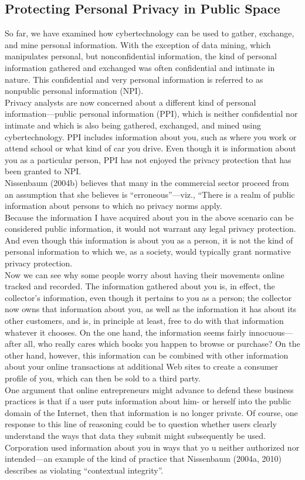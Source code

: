 \documentclass[12pt]{article}
\theoremstyle{definition}
\begin{document}
\subsection{Protecting Personal Privacy in Public Space}
So far, we have examined how cybertechnology can be used to gather, exchange, and
mine personal information. With the exception of data mining, which manipulates
personal, but nonconfidential information, the kind of personal information gathered
and exchanged was often confidential and intimate in nature. This confidential and very personal information is
referred to as nonpublic personal information (NPI).\\
Privacy analysts are now concerned
about a different kind of personal information—public personal information (PPI), which
is neither confidential nor intimate and which is also being gathered, exchanged, and
mined using cybertechnology.
PPI includes information about you, such as where you work or attend school or what
kind of car you drive. Even though it is information about you as a particular person, PPI
has not enjoyed the privacy protection that has been granted to NPI.\\
Nissenbaum (2004b) believes
that many in the commercial sector proceed from an assumption that she believes is
“erroneous”—viz., “There is a realm of public information about persons to which no
privacy norms apply.\\
Because the information I have acquired about you in the above scenario can be
considered public information, it would not warrant any legal privacy protection. And
even though this information is about you as a person, it is not the kind of personal
information to which we, as a society, would typically grant normative privacy protection.\\
Now we can see why some people worry about having their movements online
tracked and recorded. The information gathered about you is, in effect, the collector's
information, even though it pertains to you as a person; the collector now owns that information
about you, as well as the information it has about its other customers, and is, in principle
at least, free to do with that information whatever it chooses. On the one hand, the
information seems fairly innocuous—after all, who really cares which books you happen
to browse or purchase? On the other hand, however, this information can be combined
with other information about your online transactions at additional Web sites to create a
consumer profile of you, which can then be sold to a third party.\\
One argument that online entrepreneurs might advance to defend these business
practices is that if a user puts information about him- or herself into the public domain of
the Internet, then that information is no longer private. Of course, one response to this
line of reasoning could be to question whether users clearly understand the ways that data
they submit might subsequently be used. Corporation used information about you in ways that yo u neither
authorized nor intended—an example of the kind of practice that Nissenbaum (2004a,
2010) describes as violating “contextual integrity”.
\end{document}
